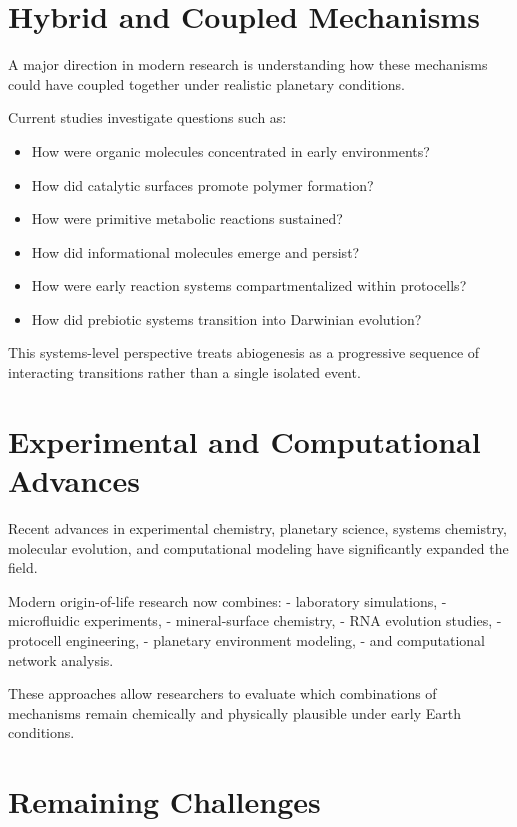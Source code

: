 \documentclass[
  oneside]{book}
\providecommand{\tightlist}{%
  \setlength{\itemsep}{0pt}\setlength{\parskip}{0pt}}
\begin{document}
\section{Hybrid and Coupled Mechanisms}\label{hybrid-and-coupled-mechanisms}

A major direction in modern research is understanding how these mechanisms could have coupled together under realistic planetary conditions.

Current studies investigate questions such as:

\begin{itemize}
\tightlist
\item
  How were organic molecules concentrated in early environments?
\item
  How did catalytic surfaces promote polymer formation?
\item
  How were primitive metabolic reactions sustained?
\item
  How did informational molecules emerge and persist?
\item
  How were early reaction systems compartmentalized within protocells?
\item
  How did prebiotic systems transition into Darwinian evolution?
\end{itemize}

This systems-level perspective treats abiogenesis as a progressive sequence of interacting transitions rather than a single isolated event.

\section{Experimental and Computational Advances}\label{experimental-and-computational-advances}

Recent advances in experimental chemistry, planetary science, systems chemistry, molecular evolution, and computational modeling have significantly expanded the field.

Modern origin-of-life research now combines:
- laboratory simulations,
- microfluidic experiments,
- mineral-surface chemistry,
- RNA evolution studies,
- protocell engineering,
- planetary environment modeling,
- and computational network analysis.

These approaches allow researchers to evaluate which combinations of mechanisms remain chemically and physically plausible under early Earth conditions.

\section{Remaining Challenges}\label{remaining-challenges}
\end{document}
